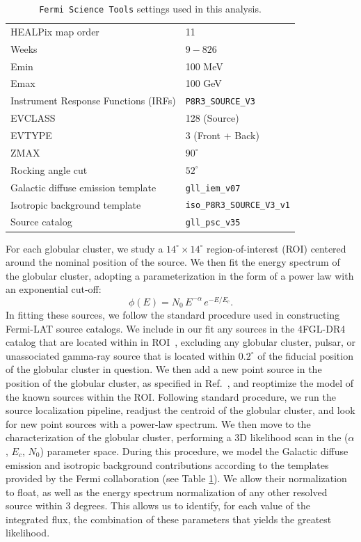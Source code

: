 \documentclass[a4paper,11pt]{article}
\begin{document}
\begin{table}[t]
\centering
\begin{tabular}{ | l| l|  }
\hline
HEALPix map order& 11  \\ 
Weeks & $9-826$  \\ 
Emin & 100 MeV \\
Emax & 100 GeV \\
Instrument Response Functions (IRFs) & \verb|P8R3_SOURCE_V3| \\
EVCLASS & 128 (Source)  \\ 
EVTYPE & 3 (Front + Back)  \\
ZMAX & $90^{\circ}$ \\
Rocking angle cut & $52^{\circ}$ \\
Galactic diffuse emission template & \verb|gll_iem_v07| \\
Isotropic background template & \verb|iso_P8R3_SOURCE_V3_v1| \\
Source catalog & \verb|gll_psc_v35| \\ 
\hline
\end{tabular}
\caption{\texttt{Fermi Science Tools} settings used in this analysis. }
\label{tab:settings}
\end{table}

For each globular cluster, we study a $14^{\circ} \times 14^{\circ}$ region-of-interest (ROI) centered around the nominal position of the source. We then fit the energy spectrum of the globular cluster, adopting a parameterization in the form of a power law with an exponential cut-off:
\begin{equation}
    \phi(E) = N_0 \, E^{-\alpha} \, e^{-E/E_c}. 
\label{eq:energy-spectrum}
\end{equation}
%
In fitting these sources, we follow the standard procedure used in constructing Fermi-LAT source catalogs. 
We include in our fit any sources in the 4FGL-DR4 catalog that are located within in ROI~\cite{Ballet:2023qzs}, excluding any globular cluster, pulsar, or unassociated gamma-ray source that is located within $0.2^\circ$ of the fiducial position of the globular cluster in question. We then add a new point source in the position of the globular cluster, as specified in Ref.~\cite{harris2010newcatalogglobularclusters}, and reoptimize the model of the known sources within the ROI.
Following standard procedure, we run the source localization pipeline, readjust the centroid of the globular cluster, and look for new point sources with a power-law spectrum. 
We then move to the characterization of the globular cluster, performing a 3D likelihood scan in the ($\alpha$, $E_{c}$, $N_0$) parameter space. 
%
During this procedure, we model the Galactic diffuse emission and isotropic background contributions according to the templates provided by the Fermi collaboration (see Table \ref{tab:settings}). We allow their normalization to float, as well as the energy spectrum normalization of any other resolved source within 3 degrees.
%
This allows us to identify, for each value of the integrated flux, the combination of these parameters that yields the greatest likelihood. 
\end{document}
